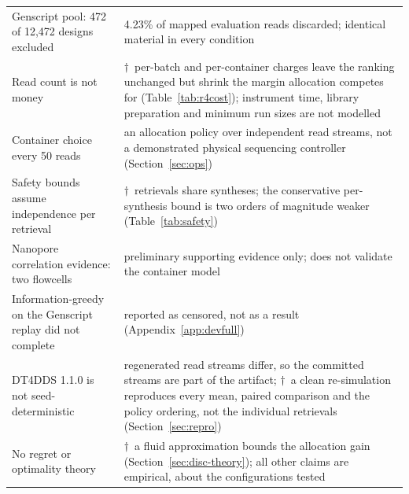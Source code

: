 \begin{table}[!b]
\begin{tabular}{@{}p{31mm}p{47mm}@{}}
Genscript pool: 472 of 12{,}472 designs excluded & 4.23\% of mapped evaluation reads discarded; identical material in every condition \\
Read count is not money & $\dagger$~per-batch and per-container charges leave the ranking unchanged but shrink the margin allocation competes for (Table~\ref{tab:r4cost}); instrument time, library preparation and minimum run sizes are not modelled \\
Container choice every 50 reads & an allocation policy over independent read streams, not a demonstrated physical sequencing controller (Section~\ref{sec:ops}) \\
Safety bounds assume independence per retrieval & $\dagger$~retrievals share syntheses; the conservative per-synthesis bound is two orders of magnitude weaker (Table~\ref{tab:safety}) \\
Nanopore correlation evidence: two flowcells & preliminary supporting evidence only; does not validate the container model \\
Information-greedy on the Genscript replay did not complete & reported as censored, not as a result (Appendix~\ref{app:devfull}) \\
DT4DDS 1.1.0 is not seed-deterministic & regenerated read streams differ, so the committed streams are part of the artifact; $\dagger$~a clean re-simulation reproduces every mean, paired comparison and the policy ordering, not the individual retrievals (Section~\ref{sec:repro}) \\
No regret or optimality theory & $\dagger$~a fluid approximation bounds the allocation gain (Section~\ref{sec:disc-theory}); all other claims are empirical, about the configurations tested \\
\bottomrule
\end{tabular}
\end{table}
